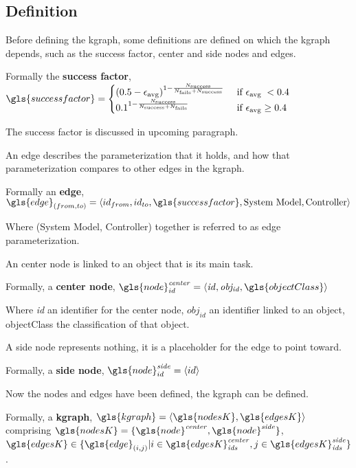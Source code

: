 \subsection{Definition}%
\label{subsec:kgraph_definition}
Before defining the \ac{kgraph}, some definitions are defined on which the \ac{kgraph} depends, such as the success factor, center and side nodes and edges.\bs

Formally the \textbf{success factor}, $\gls{successfactor} = \begin{cases} \left(0.5-\epsilon_{\textrm {avg}}\right)^{1-\frac{N_\textrm{success}}{N_\textrm{fails}+ N_\textrm{success}}} & \textrm { if } \epsilon_{\textrm {avg }}<0.4 \\ 0.1^{1-\frac{N_\textrm{success}}{N_\textrm{success}+N_\textrm{fails}}} & \textrm{ if } \epsilon_{\textrm{avg}} \geq 0.4 \end{cases}$\bs

\noindent The success factor is discussed in upcoming paragraph.\bs

\noindent An edge describes the parameterization that it holds, and how that parameterization compares to other edges in the \ac{kgraph}.\bs

Formally an \textbf{edge}, $\gls{edge}_{(from, to)} = \left\langle id_{from}, id_{to}, \gls{successfactor}, \textrm{System Model}, \textrm{Controller}\right\rangle$\bs

\noindent Where (System Model, Controller) together is referred to as edge parameterization.\bs

\noindent An center node is linked to an object that is its main task.\bs

Formally, a \textbf{center node}, $\gls{node}^{\mathit{center}}_{id} =\left\langle \mathit{id}, \mathit{obj_{id}}, \gls{objectClass} \right\rangle $\bs

Where \textit{id} an identifier for the center node, $\mathit{obj_{id}}$ an identifier linked to an object, \gls{objectClass} the classification of that object.\bs

\noindent A side node represents nothing, it is a placeholder for the edge to point toward.\bs

Formally, a \textbf{side node}, $\gls{node}^{\mathit{side}}_{id} =\left\langle id \right\rangle $\bs

\noindent Now the nodes and edges have been defined, the \ac{kgraph} can be defined.\bs

Formally, a \textbf{\acl{kgraph}}, $\gls{kgraph} = \left\langle \gls{nodesK}, \gls{edgesK} \right\rangle $
\\comprising $\gls{nodesK} = \{\gls{node}^{\mathit{center}}, \gls{node}^{\mathit{side}}\}$, \quad $\gls{edgesK} \in \{\gls{edge}_{(i,j)}| i \in \gls{edgesK}^\mathit{center}_\mathit{ids}, j \in \gls{edgesK}^\mathit{side}_\mathit{ids} \}$.\bs

